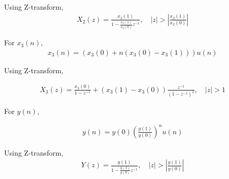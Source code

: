 \documentclass[journal,12pt,twocolumn]{IEEEtran}
\providecommand{\brak}[1]{\ensuremath{\left(#1\right)}}
\theoremstyle{remark}
\providecommand{\abs}[1]{\left\vert#1\right\vert}
\begin{document}
Using Z-transform,
\begin{align}
X_2(z) = \frac{x_2(1)}{1-\frac{x_2(1)}{x_2(0)}z^{-1}},  \quad \abs{z}>\abs{\frac{x_2(1)}{x_2(0)}}
\end{align}

For $x_3(n)$,
\begin{align}
x_3(n) = \brak{x_3(0) + n\brak{x_3(0) - x_3(1)}}u(n)
\end{align}

Using Z-transform,

\begin{align}
X_3(z) = \frac{x_3(0)}{1-z^{-1}} + \brak{x_3(1) - x_3(0)}\frac{z^{-1}}{(1-z^{-1})^2} ,
\quad |z| > 1
\end{align}

For $y(n)$,

\begin{align}
y(n) = y(0)\brak{\frac{y(1)}{y(0)}}^n u(n)
\end{align}

Using Z-transform,
\begin{align}
Y(z) = \frac{y(1)}{1-\frac{y(1)}{y(0)}z^{-1}}, \quad \abs{z}>\abs{\frac{y(1)}{y(0)}}
\end{align}
\end{document}
